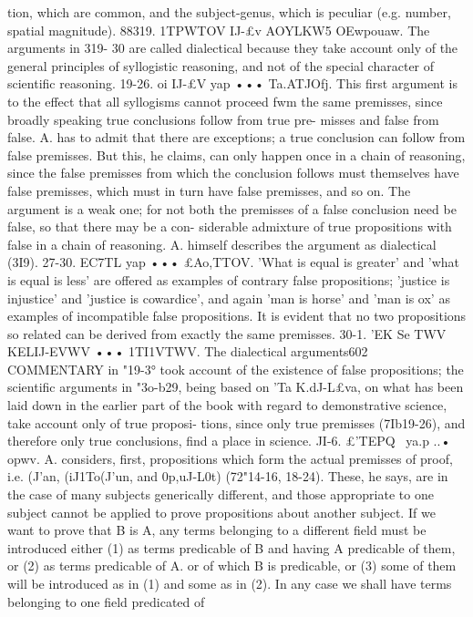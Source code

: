 {{{{{{{{{{{{{{{{{{{{{{{{{{{{{{{{{{{{{{tion, which are common, and the subject-genus, which is peculiar
(e.g. number, spatial magnitude).
88319. 1TPWTOV IJ-£v AOYLKW5 OEwpouaw. The arguments in 319-
30 are called dialectical because they take account only of the
general principles of syllogistic reasoning, and not of the special
character of scientific reasoning.
19-26. oi IJ-£V yap ••• Ta.ATJOfj. This first argument is to the
effect that all syllogisms cannot proceed fwm the same premisses,
since broadly speaking true conclusions follow from true pre-
misses and false from false. A. has to admit that there are
exceptions; a true conclusion can follow from false premisses.
But this, he claims, can only happen once in a chain of reasoning,
since the false premisses from which the conclusion follows must
themselves have false premisses, which must in turn have false
premisses, and so on.
The argument is a weak one; for not both the premisses of
a false conclusion need be false, so that there may be a con-
siderable admixture of true propositions with false in a chain of
reasoning. A. himself describes the argument as dialectical (3I9).
27-30. EC7TL yap ••• £Ao,TTOV. 'What is equal is greater' and
'what is equal is less' are offered as examples of contrary false
propositions; 'justice is injustice' and 'justice is cowardice', and
again 'man is horse' and 'man is ox' as examples of incompatible
false propositions. It is evident that no two propositions so
related can be derived from exactly the same premisses.
30-1. 'EK Se TWV KELIJ-EVWV ••• 1TI1VTWV. The dialectical arguments602
COMMENTARY
in "19-3° took account of the existence of false propositions;
the scientific arguments in "3o-b29, being based on 'Ta K.dJ-L£va, on
what has been laid down in the earlier part of the book with
regard to demonstrative science, take account only of true proposi-
tions, since only true premisses (7Ib19-26), and therefore only
true conclusions, find a place in science.
JI-6. £'TEPQ~ ya.p ..• opwv. A. considers, first, propositions
which form the actual premisses of proof, i.e. (J'an, (iJ1To(J'un,
and 0p,uJ-L0t) (72"14-16, 18-24). These, he says, are in the case of
many subjects generically different, and those appropriate to
one subject cannot be applied to prove propositions about
another subject. If we want to prove that B is A, any terms
belonging to a different field must be introduced either (1) as
terms predicable of B and having A predicable of them, or (2)
as terms predicable of A. or of which B is predicable, or (3) some
of them will be introduced as in (1) and some as in (2). In any
case we shall have terms belonging to one field predicated of
}}}}}}}}}}}}}}}}}}}}}}}}}}}}}}}}}}}}}}
